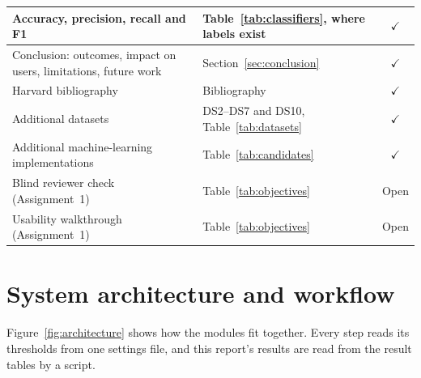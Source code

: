 {\begin{longtable}{|L{7.4cm}|L{6.2cm}|c|}
Accuracy, precision, recall and F1 & Table~\ref{tab:classifiers}, where labels exist & $\checkmark$ \\ \hline
Conclusion: outcomes, impact on users, limitations, future work & Section~\ref{sec:conclusion} & $\checkmark$ \\ \hline
Harvard bibliography & Bibliography & $\checkmark$ \\ \hline
Additional datasets & DS2--DS7 and DS10, Table~\ref{tab:datasets} & $\checkmark$ \\ \hline
Additional machine-learning implementations & Table~\ref{tab:candidates} & $\checkmark$ \\ \hline
Blind reviewer check (Assignment~1) & Table~\ref{tab:objectives} & Open \\ \hline
Usability walkthrough (Assignment~1) & Table~\ref{tab:objectives} & Open \\ \hline
\end{longtable}}

\section{System architecture and workflow}
\label{app:architecture}

Figure~\ref{fig:architecture} shows how the modules fit together. Every step reads its thresholds from one settings
file, and this report's results are read from the result tables by a script.

